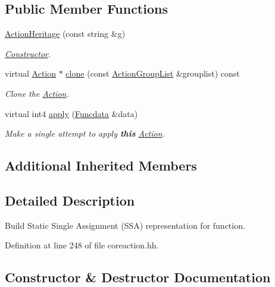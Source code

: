 \subsection*{Public Member Functions}
\begin{DoxyCompactItemize}
\item 
\mbox{\hyperlink{class_action_heritage_adcfa762662965f97aed79d2ed3427550}{Action\+Heritage}} (const string \&g)
\begin{DoxyCompactList}\small\item\em \mbox{\hyperlink{class_constructor}{Constructor}}. \end{DoxyCompactList}\item 
virtual \mbox{\hyperlink{class_action}{Action}} $\ast$ \mbox{\hyperlink{class_action_heritage_ac3da4f8c7eac163ec7c456dc6ed947fd}{clone}} (const \mbox{\hyperlink{class_action_group_list}{Action\+Group\+List}} \&grouplist) const
\begin{DoxyCompactList}\small\item\em Clone the \mbox{\hyperlink{class_action}{Action}}. \end{DoxyCompactList}\item 
virtual int4 \mbox{\hyperlink{class_action_heritage_a10a113512ed64008b5c8fb54d4040843}{apply}} (\mbox{\hyperlink{class_funcdata}{Funcdata}} \&data)
\begin{DoxyCompactList}\small\item\em Make a single attempt to apply {\bfseries{this}} \mbox{\hyperlink{class_action}{Action}}. \end{DoxyCompactList}\end{DoxyCompactItemize}
\subsection*{Additional Inherited Members}


\subsection{Detailed Description}
Build Static Single Assignment (S\+SA) representation for function. 

Definition at line 248 of file coreaction.\+hh.



\subsection{Constructor \& Destructor Documentation}
\mbox{\label{class_action_heritage_adcfa762662965f97aed79d2ed3427550}} 
